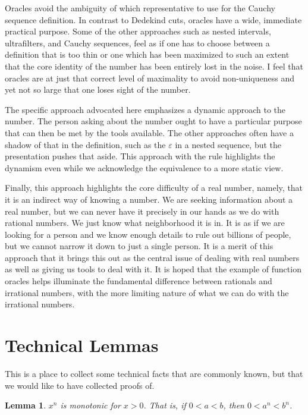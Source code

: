 \documentclass[12pt]{article}
\newtheorem{lemma}{Lemma}[subsection]
\theoremstyle{remark}
\begin{document}
Oracles avoid the ambiguity of which representative to use for the Cauchy sequence definition. In contrast to Dedekind cuts, oracles have a wide, immediate practical purpose. Some of the other approaches such as nested intervals, ultrafilters, and Cauchy sequences, feel as if one has to choose between a definition that is too thin or one which has been maximized to such an extent that the core identity of the number has been entirely lost in the noise. I feel that oracles are at just that correct level of maximality to avoid non-uniqueness and yet not so large that one loses sight of the number. 

The specific approach advocated here emphasizes a dynamic approach to the number. The person asking about the number ought to have a particular purpose that can then be met by the tools available. The other approaches often have a shadow of that in the definition, such as the $\varepsilon$ in a nested sequence, but the presentation pushes that aside. This approach with the rule highlights the dynamism even while we acknowledge the equivalence to a more static view. 

Finally, this approach highlights the core difficulty of a real number, namely, that it is an indirect way of knowing a number. We are seeking information about a real number, but we can never have it precisely in our hands as we do with rational numbers. We just know what neighborhood it is in. It is as if we are looking for a person and we know enough details to rule out billions of people, but we cannot narrow it down to just a single person. It is a merit of this approach that it brings this out as the central issue of dealing with real numbers as well as giving us tools to deal with it. It is hoped that the example of function oracles helps illuminate the fundamental difference between rationals and irrational numbers, with the more limiting nature of what we can do with the irrational numbers. 

\appendix

\section{Technical Lemmas}\label{app:A}

This is a place to collect some technical facts that are commonly known, but that we would like to have collected proofs of. 

\begin{lemma}
$x^n$ is monotonic for $x>0$. That is, if $0 < a < b$, then $0 < a^n<b^n$.
\end{lemma}
\end{document}
